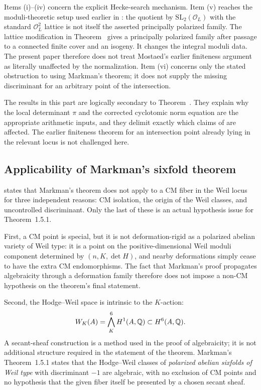 \begin{theoremB}
\begin{enumerate}[label=(\roman*)]
\end{enumerate}
Items (i)--(iv) concern the explicit Hecke-search mechanism.  Item (v) reaches the moduli-theoretic setup used earlier in \cite{Mostaed2026}: the quotient by $\mathrm{SL}_2(\mathcal O_L)$ with the standard $\mathcal O_L^2$ lattice is not itself the asserted principally polarized family.  The lattice modification in Theorem~ gives a principally polarized family after passage to a connected finite cover and an isogeny. It changes the integral moduli data.  The present paper therefore does not treat Mostaed's earlier finiteness argument as literally unaffected by the normalization.  Item (vi) concerns only the stated obstruction to using Markman's theorem; it does not supply the missing discriminant for an arbitrary point of the intersection.
\end{theoremB}


The results in this part are logically secondary to Theorem~.  They explain why the local determinant $\pi$ and the corrected cyclotomic norm equation are the appropriate arithmetic inputs, and they delimit exactly which claims of \cite{Mostaed2026} are affected.  The earlier finiteness theorem for an intersection point already lying in the relevant locus is not challenged here.

\subsection{Applicability of Markman's sixfold theorem}
\cite[Observation~4.6]{Mostaed2026} states that Markman's theorem does not apply to a CM fiber in the Weil locus for three independent reasons: CM isolation, the origin of the Weil classes, and uncontrolled discriminant.  Only the last of these is an actual hypothesis issue for Theorem~1.5.1.

First, a CM point is special, but it is not deformation-rigid as a polarized abelian variety of Weil type: it is a point on the positive-dimensional Weil moduli component determined by $(n,K,\det H)$, and nearby deformations simply cease to have the extra CM endomorphisms.  The fact that Markman's proof propagates algebraicity through a deformation family therefore does not impose a non-CM hypothesis on the theorem's final statement.

Second, the Hodge--Weil space is intrinsic to the $K$-action:
\[
 W_K(A)=\bigwedge_K^{6}H^1(A,\mathbb Q)\subset H^6(A,\mathbb Q).
\]
A secant-sheaf construction is a method used in the proof of algebraicity; it is not additional structure required in the statement of the theorem.  Markman's Theorem~1.5.1 states that the Hodge--Weil classes of \emph{polarized abelian sixfolds of Weil type} with discriminant $-1$ are algebraic, with no exclusion of CM points and no hypothesis that the given fiber itself be presented by a chosen secant sheaf.

